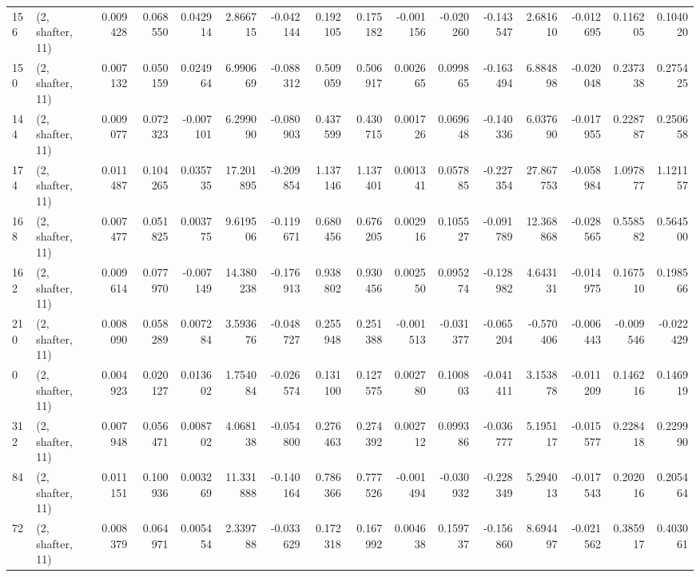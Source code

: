 \begin{tabular}{llrrrrrrrrrrrrrr}
156 &  (2, shafter, 11) &   0.009428 &  0.068550 &  0.042914 &     2.866715 &  -0.042144 &   0.192105 &   0.175182 & -0.001156 & -0.020260 & -0.143547 &    2.681610 & -0.012695 &  0.116205 &  0.104020 \\
150 &  (2, shafter, 11) &   0.007132 &  0.050159 &  0.024964 &     6.990669 &  -0.088312 &   0.509059 &   0.506917 &  0.002665 &  0.099865 & -0.163494 &    6.884898 & -0.020048 &  0.237338 &  0.275425 \\
144 &  (2, shafter, 11) &   0.009077 &  0.072323 & -0.007101 &     6.299090 &  -0.080903 &   0.437599 &   0.430715 &  0.001726 &  0.069648 & -0.140336 &    6.037690 & -0.017955 &  0.228787 &  0.250658 \\
174 &  (2, shafter, 11) &   0.011487 &  0.104265 &  0.035735 &    17.201895 &  -0.209854 &   1.137146 &   1.137401 &  0.001341 &  0.057885 & -0.227354 &   27.867753 & -0.058984 &  1.097877 &  1.121157 \\
168 &  (2, shafter, 11) &   0.007477 &  0.051825 &  0.003775 &     9.619506 &  -0.119671 &   0.680456 &   0.676205 &  0.002916 &  0.105527 & -0.091789 &   12.368868 & -0.028565 &  0.558582 &  0.564500 \\
162 &  (2, shafter, 11) &   0.009614 &  0.077970 & -0.007149 &    14.380238 &  -0.176913 &   0.938802 &   0.930456 &  0.002550 &  0.095274 & -0.128982 &    4.643131 & -0.014975 &  0.167510 &  0.198566 \\
210 &  (2, shafter, 11) &   0.008090 &  0.058289 &  0.007284 &     3.593676 &  -0.048727 &   0.255948 &   0.251388 & -0.001513 & -0.031377 & -0.065204 &   -0.570406 & -0.006443 & -0.009546 & -0.022429 \\
0   &  (2, shafter, 11) &   0.004923 &  0.020127 &  0.013602 &     1.754084 &  -0.026574 &   0.131100 &   0.127575 &  0.002780 &  0.100803 & -0.041411 &    3.153878 & -0.011209 &  0.146216 &  0.146919 \\
312 &  (2, shafter, 11) &   0.007948 &  0.056471 &  0.008702 &     4.068138 &  -0.054800 &   0.276463 &   0.274392 &  0.002712 &  0.099386 & -0.036777 &    5.195117 & -0.015577 &  0.228418 &  0.229990 \\
84  &  (2, shafter, 11) &   0.011151 &  0.100936 &  0.003269 &    11.331888 &  -0.140164 &   0.786366 &   0.777526 & -0.001494 & -0.030932 & -0.228349 &    5.294013 & -0.017543 &  0.202016 &  0.205464 \\
72  &  (2, shafter, 11) &   0.008379 &  0.064971 &  0.005454 &     2.339788 &  -0.033629 &   0.172318 &   0.167992 &  0.004638 &  0.159737 & -0.156860 &    8.694497 & -0.021562 &  0.385917 &  0.403061 \\

\end{tabular}
